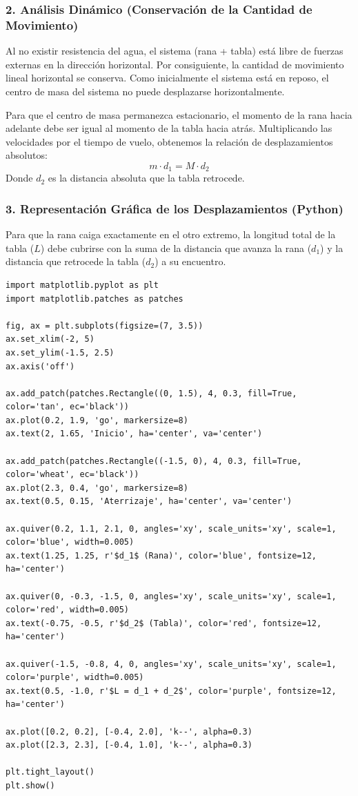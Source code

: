 \documentclass[12pt, a4paper]{article}
\begin{document}
\subsubsection*{2. Análisis Dinámico (Conservación de la Cantidad de Movimiento)}
Al no existir resistencia del agua, el sistema (rana + tabla) está libre de fuerzas externas en la dirección horizontal. Por consiguiente, la cantidad de movimiento lineal horizontal se conserva. Como inicialmente el sistema está en reposo, el centro de masa del sistema no puede desplazarse horizontalmente.

Para que el centro de masa permanezca estacionario, el momento de la rana hacia adelante debe ser igual al momento de la tabla hacia atrás. Multiplicando las velocidades por el tiempo de vuelo, obtenemos la relación de desplazamientos absolutos:
$$m \cdot d_1 = M \cdot d_2$$
Donde $d_2$ es la distancia absoluta que la tabla retrocede.

\subsubsection*{3. Representación Gráfica de los Desplazamientos (Python)}
Para que la rana caiga exactamente en el otro extremo, la longitud total de la tabla ($L$) debe cubrirse con la suma de la distancia que avanza la rana ($d_1$) y la distancia que retrocede la tabla ($d_2$) a su encuentro.

\begin{lstlisting}
import matplotlib.pyplot as plt
import matplotlib.patches as patches

fig, ax = plt.subplots(figsize=(7, 3.5))
ax.set_xlim(-2, 5)
ax.set_ylim(-1.5, 2.5)
ax.axis('off')

ax.add_patch(patches.Rectangle((0, 1.5), 4, 0.3, fill=True, color='tan', ec='black'))
ax.plot(0.2, 1.9, 'go', markersize=8)
ax.text(2, 1.65, 'Inicio', ha='center', va='center')

ax.add_patch(patches.Rectangle((-1.5, 0), 4, 0.3, fill=True, color='wheat', ec='black'))
ax.plot(2.3, 0.4, 'go', markersize=8)
ax.text(0.5, 0.15, 'Aterrizaje', ha='center', va='center')

ax.quiver(0.2, 1.1, 2.1, 0, angles='xy', scale_units='xy', scale=1, color='blue', width=0.005)
ax.text(1.25, 1.25, r'$d_1$ (Rana)', color='blue', fontsize=12, ha='center')

ax.quiver(0, -0.3, -1.5, 0, angles='xy', scale_units='xy', scale=1, color='red', width=0.005)
ax.text(-0.75, -0.5, r'$d_2$ (Tabla)', color='red', fontsize=12, ha='center')

ax.quiver(-1.5, -0.8, 4, 0, angles='xy', scale_units='xy', scale=1, color='purple', width=0.005)
ax.text(0.5, -1.0, r'$L = d_1 + d_2$', color='purple', fontsize=12, ha='center')

ax.plot([0.2, 0.2], [-0.4, 2.0], 'k--', alpha=0.3)
ax.plot([2.3, 2.3], [-0.4, 1.0], 'k--', alpha=0.3)

plt.tight_layout()
plt.show()
\end{lstlisting}
\end{document}
